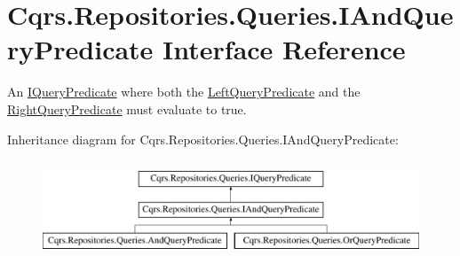 \hypertarget{interfaceCqrs_1_1Repositories_1_1Queries_1_1IAndQueryPredicate}{}\section{Cqrs.\+Repositories.\+Queries.\+I\+And\+Query\+Predicate Interface Reference}
\label{interfaceCqrs_1_1Repositories_1_1Queries_1_1IAndQueryPredicate}


An \hyperlink{interfaceCqrs_1_1Repositories_1_1Queries_1_1IQueryPredicate}{I\+Query\+Predicate} where both the \hyperlink{interfaceCqrs_1_1Repositories_1_1Queries_1_1IAndQueryPredicate_a35166ddeebe86048dba2e7f03407aa94_a35166ddeebe86048dba2e7f03407aa94}{Left\+Query\+Predicate} and the \hyperlink{interfaceCqrs_1_1Repositories_1_1Queries_1_1IAndQueryPredicate_ab24faa4c3423f91a8d9115b2cae6684b_ab24faa4c3423f91a8d9115b2cae6684b}{Right\+Query\+Predicate} must evaluate to true.  


Inheritance diagram for Cqrs.\+Repositories.\+Queries.\+I\+And\+Query\+Predicate\+:\begin{figure}[H]
\begin{center}
\leavevmode
\includegraphics[height=2.916667cm]{interfaceCqrs_1_1Repositories_1_1Queries_1_1IAndQueryPredicate}
\end{center}
\end{figure}
